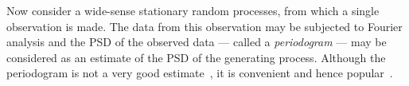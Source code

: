 Now consider a wide-sense stationary random processes, from which a single observation is made. The data from this observation may be subjected to Fourier analysis and the PSD of the observed data --- called a \textit{periodogram} --- may be considered as an estimate of the PSD of the generating process. Although the periodogram is not a very good estimate~\cite{}, it is convenient and hence popular~\cite{lagaeDutre}. 
\TBC